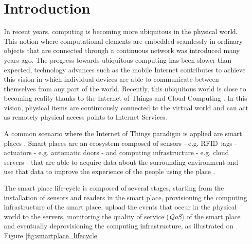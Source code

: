 \section{Introduction}
\label{sec:introduction}
In recent years, computing is becoming more ubiquitous in the physical world. This
notion where computational elements are embedded seamlessly in ordinary objects that
are connected through a continuous network was introduced many years ago\cite{weiser1991computer}.
The progress towards ubiquitous computing has been slower than expected, technology advances such
as the mobile Internet contributes to achieve this vision in which individual devices are
able to communicate between themselves from any part of the world\cite{gubbi2013internet}. Recently,
this ubiquitous world is close to becoming reality thanks to the Internet of Things and Cloud Computing
\cite{caceres2012ubicomp}. In this vision, physical items are continuously connected to the virtual
world and can act as remotely physical access points to Internet Services\cite{mattern2010internet}.

A common scenario where the Internet of Things paradigm is applied are smart places \cite{atzori2010internet}.
Smart places are an ecosystem composed of sensors - e.g. RFID tags - actuators - e.g. automatic doors -
and computing infrastructure - e.g. cloud servers - that are able to acquire data about the surrounding
environment and use that data to improve the experience of the people using the place \cite{cook2004smart}.

The smart place life-cycle is composed of several stages, starting from the installation of sensors and
readers in the smart place, provisioning the computing infrastructure of the smart place, upload the events
that occur in the physical world to the servers, monitoring the quality of service (\textit{QoS}) of the smart
place and eventually deprovisioning the computing infrastructure, as illustrated on Figure
\ref{fig:smartplace_lifecycle}.


